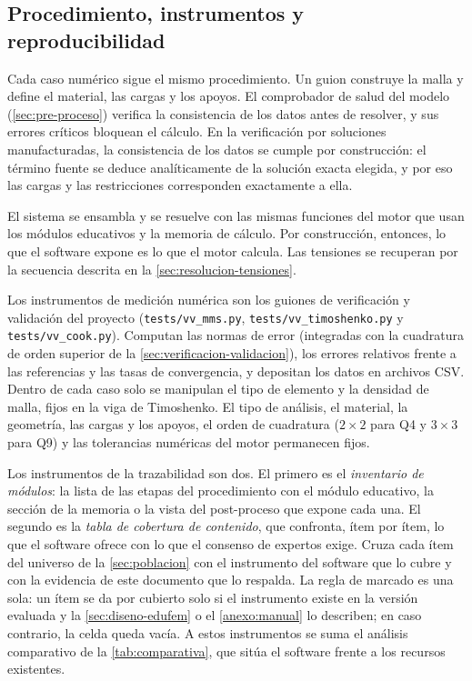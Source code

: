 \subsection{Procedimiento, instrumentos y reproducibilidad}
\label{sec:validacion-datos}

Cada caso numérico sigue el mismo procedimiento. Un guion construye la malla y define el material, las cargas y los apoyos. El comprobador de salud del modelo (\autoref{sec:pre-proceso}) verifica la consistencia de los datos antes de resolver, y sus errores críticos bloquean el cálculo. En la verificación por soluciones manufacturadas, la consistencia de los datos se cumple por construcción: el término fuente se deduce analíticamente de la solución exacta elegida, y por eso las cargas y las restricciones corresponden exactamente a ella.

El sistema se ensambla y se resuelve con las mismas funciones del motor que usan los módulos educativos y la memoria de cálculo. Por construcción, entonces, lo que el software expone es lo que el motor calcula. Las tensiones se recuperan por la secuencia descrita en la \autoref{sec:resolucion-tensiones}.

Los instrumentos de medición numérica son los guiones de verificación y validación del proyecto (\texttt{tests/vv\_mms.py}, \texttt{tests/vv\_timoshenko.py} y \texttt{tests/vv\_cook.py}). Computan las normas de error (integradas con la cuadratura de orden superior de la \autoref{sec:verificacion-validacion}), los errores relativos frente a las referencias y las tasas de convergencia, y depositan los datos en archivos CSV. Dentro de cada caso solo se manipulan el tipo de elemento y la densidad de malla, fijos en la viga de Timoshenko. El tipo de análisis, el material, la geometría, las cargas y los apoyos, el orden de cuadratura ($2\times2$ para Q4 y $3\times3$ para Q9) y las tolerancias numéricas del motor permanecen fijos.

Los instrumentos de la trazabilidad son dos. El primero es el \emph{inventario de módulos}: la lista de las etapas del procedimiento con el módulo educativo, la sección de la memoria o la vista del post-proceso que expone cada una. El segundo es la \emph{tabla de cobertura de contenido}, que confronta, ítem por ítem, lo que el software ofrece con lo que el consenso de expertos exige. Cruza cada ítem del universo de la \autoref{sec:poblacion} con el instrumento del software que lo cubre y con la evidencia de este documento que lo respalda. La regla de marcado es una sola: un ítem se da por cubierto solo si el instrumento existe en la versión evaluada y la \autoref{sec:diseno-edufem} o el \autoref{anexo:manual} lo describen; en caso contrario, la celda queda vacía. A estos instrumentos se suma el análisis comparativo de la \autoref{tab:comparativa}, que sitúa el software frente a los recursos existentes.

